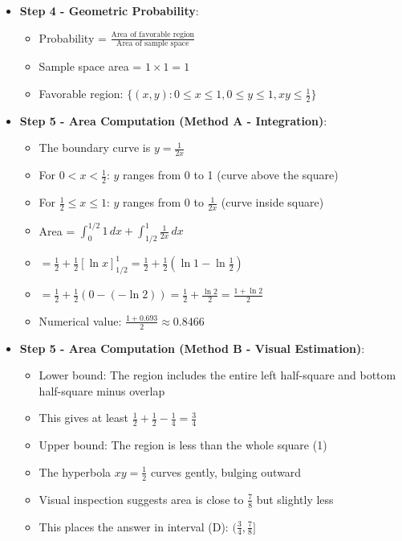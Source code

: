 \documentclass[11pt]{article}
\begin{document}
\begin{techniquesbox}
\begin{itemize}[leftmargin=*]
    \item \textbf{Step 4 - Geometric Probability}: 
    \begin{itemize}
        \item Probability = $\frac{\text{Area of favorable region}}{\text{Area of sample space}}$
        \item Sample space area = $1 \times 1 = 1$
        \item Favorable region: $\{(x,y): 0 \leq x \leq 1, 0 \leq y \leq 1, xy \leq \frac{1}{2}\}$
    \end{itemize}
    
    \item \textbf{Step 5 - Area Computation (Method A - Integration)}: 
    \begin{itemize}
        \item The boundary curve is $y = \frac{1}{2x}$
        \item For $0 < x < \frac{1}{2}$: $y$ ranges from 0 to 1 (curve above the square)
        \item For $\frac{1}{2} \leq x \leq 1$: $y$ ranges from 0 to $\frac{1}{2x}$ (curve inside square)
        \item Area = $\int_0^{1/2} 1 \, dx + \int_{1/2}^1 \frac{1}{2x} \, dx$
        \item $= \frac{1}{2} + \frac{1}{2}[\ln x]_{1/2}^1 = \frac{1}{2} + \frac{1}{2}(\ln 1 - \ln \frac{1}{2})$
        \item $= \frac{1}{2} + \frac{1}{2}(0 - (-\ln 2)) = \frac{1}{2} + \frac{\ln 2}{2} = \frac{1 + \ln 2}{2}$
        \item Numerical value: $\frac{1 + 0.693}{2} \approx 0.8466$
    \end{itemize}
    
    \item \textbf{Step 5 - Area Computation (Method B - Visual Estimation)}: 
    \begin{itemize}
        \item Lower bound: The region includes the entire left half-square and bottom half-square minus overlap
        \item This gives at least $\frac{1}{2} + \frac{1}{2} - \frac{1}{4} = \frac{3}{4}$
        \item Upper bound: The region is less than the whole square (1)
        \item The hyperbola $xy = \frac{1}{2}$ curves gently, bulging outward
        \item Visual inspection suggests area is close to $\frac{7}{8}$ but slightly less
        \item This places the answer in interval (D): $(\frac{3}{4}, \frac{7}{8}]$
    \end{itemize}
\end{itemize}


\end{techniquesbox}
\end{document}
